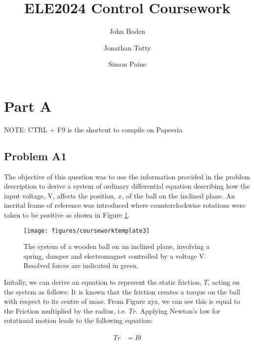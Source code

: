 \documentclass[a4paper,10pt,reqno]{amsart}
\title[ELE2024 Coursework]{ELE2024 Control Coursework}
\author[J. Boden]{John Boden}
\author[J. Tutty]{Jonathan Tutty}
\author[S. Paine]{Simon Paine}
\numberwithin{equation}{section}
\begin{document}
\maketitle

\section{Part A}

NOTE: CTRL + F9 is the shortcut to compile on Papeeria

\subsection{Problem A1}\label{sec:a1}
The objective of this question was to use the information provided in the problem description to derive a system of ordinary differential equation describing how the input voltage, V, affects the position, $x$, of the ball on the inclined plane.
\newline An inerital frame of reference was introduced where counterclockwise rotations were taken to be positive as shown in Figure \ref{fig:system}.

\begin{figure}[h]
\centering
\texttt{[image: figures/courseworktemplate3]}
\caption{The system of a wooden ball on an inclined plane, involving a spring, damper and electromagnet controlled by a voltage V. Resolved forces are indicated in green.}
\label{fig:system}
\end{figure}

\newline Initally, we can derive an equation to represent the static friction, $T$, acting on the system as follows:
\newline It is known that the friction creates a torque on the ball with respect to its centre of mass. From Figure xyz, we can see this is equal to the Friction multiplied by the radius, i.e. $Tr$. 
\newline Applying Newton's law for rotational motion leads to the following equation:

\begin{align}
\label{1.1}
Tr &= I\ddot{\theta}
\end{align}
\end{document}
